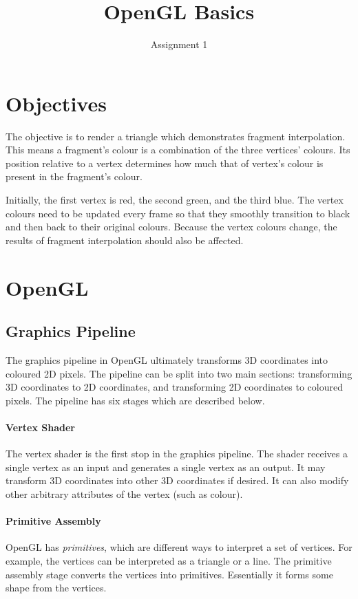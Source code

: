 \documentclass[a4paper, 12pt]{scrartcl}
\title{OpenGL Basics}
\subtitle{Assignment 1}
\date{}
\author{}
\begin{document}
\maketitle

\section{Objectives}
The objective is to render a triangle which demonstrates fragment interpolation. This means a fragment's colour is a combination of the three vertices' colours. Its position relative to a vertex determines how much that of vertex's colour is present in the fragment's colour.

Initially, the first vertex is red, the second green, and the third blue. The vertex colours need to be updated every frame so that they smoothly transition to black and then back to their original colours. Because the vertex colours change, the results of fragment interpolation should also be affected.

\section{OpenGL}
\subsection{Graphics Pipeline}
The graphics pipeline in OpenGL ultimately transforms 3D coordinates into coloured 2D pixels. The pipeline can be split into two main sections: transforming 3D coordinates to 2D coordinates, and transforming 2D coordinates to coloured pixels. The pipeline has six stages which are described below.

\paragraph{Vertex Shader}
The vertex shader is the first stop in the graphics pipeline. The shader receives a single vertex as an input and generates a single vertex as an output. It may transform 3D coordinates into other 3D coordinates if desired. It can also modify other arbitrary attributes of the vertex (such as colour).

\paragraph{Primitive Assembly}
OpenGL has \textit{primitives}, which are different ways to interpret a set of vertices. For example, the vertices can be interpreted as a triangle or a line. The primitive assembly stage converts the vertices into primitives. Essentially it forms some shape from the vertices.
\end{document}
